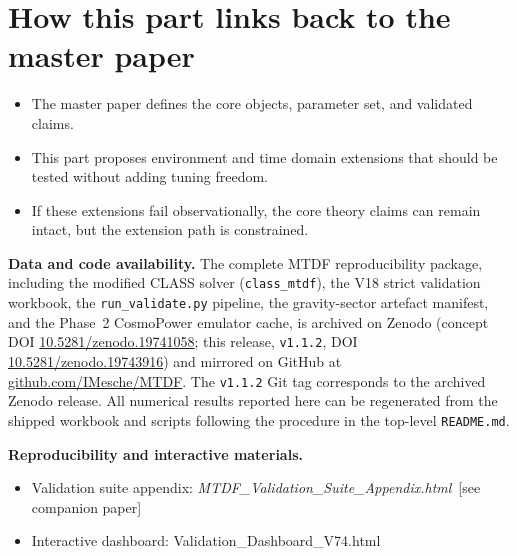 \documentclass[11pt,a4paper]{article}
\begin{document}
\section{How this part links back to the master paper}
\label{sec:links}
\begin{itemize}
  \item The master paper defines the core objects, parameter set, and validated claims.
  \item This part proposes environment and time domain extensions that should be tested without adding tuning freedom.
  \item If these extensions fail observationally, the core theory claims can remain intact, but the extension path is constrained.
\end{itemize}

\begin{mdframed}[linecolor=accent,linewidth=0.5pt,backgroundcolor=callout-bg,leftline=true,rightline=true,topline=true,bottomline=true,innerleftmargin=8pt,innerrightmargin=8pt,innertopmargin=6pt,innerbottommargin=6pt]
\textbf{Data and code availability.}
The complete MTDF reproducibility package, including the modified CLASS solver
(\texttt{class\_\allowbreak{}mtdf}), the V18 strict validation workbook, the
\texttt{run\_\allowbreak{}validate.py} pipeline, the gravity-sector artefact
manifest, and the Phase~2 CosmoPower emulator cache, is archived on Zenodo
(concept DOI \href{https://doi.org/10.5281/zenodo.19741058}{10.5281/\allowbreak{}zenodo.\allowbreak{}19741058};
this release, \texttt{v1.1.2}, DOI
\href{https://doi.org/10.5281/zenodo.19743916}{10.5281/\allowbreak{}zenodo.\allowbreak{}19743916})
and mirrored on GitHub at
\href{https://github.com/IMesche/MTDF}{github.com/\allowbreak{}IMesche/\allowbreak{}MTDF}.
The \texttt{v1.1.2} Git tag corresponds to the archived Zenodo release. All
numerical results reported here can be regenerated from the shipped workbook
and scripts following the procedure in the top-level \texttt{README.md}.

\textbf{Reproducibility and interactive materials.}\begin{itemize}
  \item Validation suite appendix: \textit{MTDF\_\allowbreak{}Validation\_\allowbreak{}Suite\_\allowbreak{}Appendix.html}~[see companion paper]
  \item Interactive dashboard: Validation\_\allowbreak{}Dashboard\_\allowbreak{}V74.html
\end{itemize}
\end{mdframed}
\end{document}
